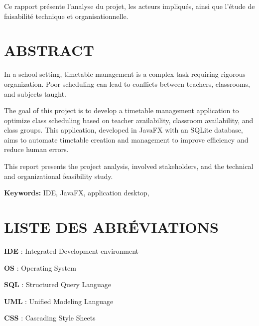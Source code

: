 \documentclass[english,12pt,a4paper]{report}
\begin{document}
\begin{spacing}{1.5}
Ce rapport présente l’analyse du projet, les acteurs impliqués, ainsi que l’étude de faisabilité technique et organisationnelle.
\bigskip 
\bigskip
\par 

\chapter*{ABSTRACT}
\hspace{1.2cm}
In a school setting, timetable management is a complex task requiring rigorous organization. Poor scheduling can lead to conflicts between teachers, classrooms, and subjects taught.

The goal of this project is to develop a timetable management application to optimize class scheduling based on teacher availability, classroom availability, and class groups. This application, developed in JavaFX with an SQLite database, aims to automate timetable creation and management to improve efficiency and reduce human errors.

This report presents the project analysis, involved stakeholders, and the technical and organizational feasibility study.


\bigskip 
\bigskip
\par 

\textbf{Keywords:} IDE, JavaFX, application desktop, 
\chapter*{LISTE DES ABRÉVIATIONS}
\textbf{IDE} : Integrated Development environment 

\textbf{OS} : 	 Operating System 

\textbf{SQL} :  	Structured Query Language

\textbf{UML} : Unified Modeling Language

\textbf{CSS} : Cascading Style Sheets
\end{spacing}

\tableofcontents

\cleardoublepage
{}

\listoffigures

\cleardoublepage
{}

\listoftables
\end{document}
